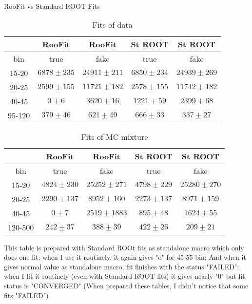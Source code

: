 \documentclass{beamer}
\begin{document}
\begin{frame}{RooFit vs Standard ROOT Fits}
{

\begin{table}[h]
  \tiny
  \begin{center}
  \caption{Fits of data}
  \begin{tabular}{|c|c|c|c|c|}
     & RooFit & RooFit & St ROOT & St ROOT \\ \hline
 bin  & true & fake & true & fake \\ \hline
15-20 &  $6878\pm235$  &  $24911\pm211$  &  $6850\pm234$  &  $24939\pm269$ \\ \hline 
20-25 &  $2599\pm155$  &  $11721\pm182$  &  $2578\pm155$  &  $11742\pm182$ \\ \hline 
40-45 &  $0\pm6$  &  $3620\pm16$  &  $1221\pm59$  &  $2399\pm68$ \\ \hline 
95-120 &  $379\pm46$  &  $621\pm49$  &  $666\pm33$  &  $337\pm27$ \\ \hline 
  \end{tabular}
  \end{center}
\end{table}

\begin{table}[h]
  \tiny
  \begin{center}
  \caption{Fits of MC mixture}
  \begin{tabular}{|c|c|c|c|c|}
     & RooFit & RooFit & St ROOT & St ROOT \\ \hline
 bin  & true & fake & true & fake \\ \hline
15-20 &  $4824\pm230$  &  $25252\pm271$  &  $4798\pm229$  &  $25280\pm270$ \\ \hline 
20-25 &  $2290\pm137$  &  $8952\pm160$  &  $2273\pm137$  &  $8971\pm159$ \\ \hline 
40-45 &  $0\pm7$  &  $2519\pm1883$  &  $895\pm48$  &  $1624\pm55$ \\ \hline 
120-500 &  $242\pm37$  &  $388\pm39$  &  $422\pm26$  &  $209\pm21$ \\ \hline 
  \end{tabular}
  \end{center}
\end{table}

\scriptsize

This table is prepared with Standard ROOt fits as standalone macro which only does one fit; when I use it routinely, it again gives "o" for 45-55 bin; And when it gives normal value as standalone macro, fit finishes with the status "FAILED"; when I fit it routinely (even with Standard ROOT fits) it gives nearly "0" but fit status is "CONVERGED"
(When prepared these tables, I didn't notice that some fits "FAILED")

}
\end{frame}
\end{document}
